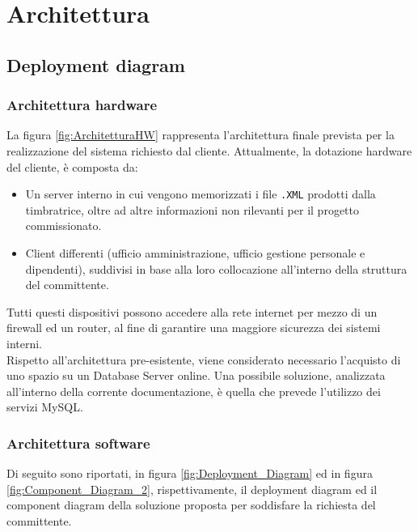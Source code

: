 \chapter{Architettura}
\section{Deployment diagram}
\subsection{Architettura hardware} \label{SS:A_HW}
\noindent
La figura \ref{fig:ArchitetturaHW} rappresenta l'architettura finale prevista per la realizzazione del sistema richiesto dal cliente. Attualmente, la dotazione hardware del cliente, è composta da:
\begin{itemize}
	\item Un server interno in cui vengono memorizzati i file \verb|.XML| prodotti dalla timbratrice, oltre ad altre informazioni non rilevanti per il progetto commissionato.
	\item Client differenti (ufficio amministrazione, ufficio gestione personale e dipendenti), suddivisi in base alla loro collocazione all'interno della struttura del committente.
\end{itemize}
Tutti questi dispositivi possono accedere alla rete internet per mezzo di un firewall ed un router, al fine di garantire una maggiore sicurezza dei sistemi interni.\\

\noindent
Rispetto all'architettura pre-esistente, viene considerato necessario l'acquisto di uno spazio su un Database Server online. Una possibile soluzione, analizzata all'interno della corrente documentazione, è quella che prevede l'utilizzo dei servizi MySQL.
\subsection{Architettura software}
Di seguito sono riportati, in figura \ref{fig:Deployment_Diagram} ed in figura \ref{fig:Component_Diagram_2}, rispettivamente, il deployment diagram ed il component diagram della soluzione proposta per soddisfare la richiesta del committente.\\

